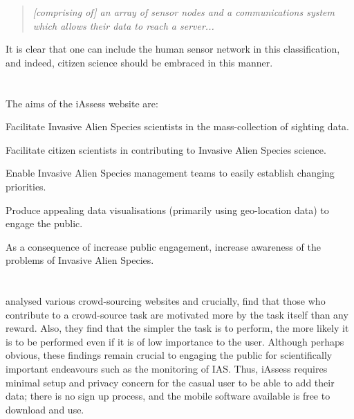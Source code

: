 \documentclass[10pt,psfig,letterpaper,twocolumn]{article}
\begin{document}
\begin{quote}\em{\footnotesize
[comprising of] an array of sensor nodes and a communications system which allows their data to reach a server...
}
\end{quote}

It is clear that one can include the human sensor network in this classification, and indeed, citizen science should be embraced in this manner.

\section*{}

The aims of the iAssess website are:
\begin{enumerate*}
\item Facilitate Invasive Alien Species scientists in the mass-collection of sighting data.
\item Facilitate citizen scientists in contributing to Invasive Alien Species science.
\item Enable Invasive Alien Species management teams to easily establish changing priorities.
\item Produce appealing data visualisations (primarily using geo-location data) to engage the public.
\item As a consequence of increase public engagement, increase awareness of the problems of Invasive Alien Species.
\end{enumerate*}

\section*{}

\citet{Wightman:2010un} analysed various crowd-sourcing websites and crucially, find that those who contribute to a crowd-source task are motivated more by the task itself than any reward.
Also, they find that the simpler the task is to perform, the more likely it is to be performed even if it is of low importance to the user.
Although perhaps obvious, these findings remain crucial to engaging the public for scientifically important endeavours such as the monitoring of IAS.
Thus, iAssess requires minimal setup and privacy concern for the casual user to be able to add their data; there is no sign up process, and the mobile software available is free to download and use.
\end{document}
